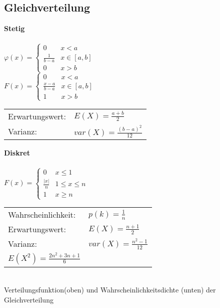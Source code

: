 		\subsection{Gleichverteilung}
      \begin{multicols}{3}
        \textbf{Stetig \skript{\pageref{sk-section-gleichverteilung-stetig}}}\\ \\
        $\varphi(x) = \begin{cases}
          0 & x < a\\
          \frac{1}{b-a} & x \in [a, b]\\
          0 & x > b
        \end{cases}$ \\
        $F(x) = \begin{cases}
          0 & x < a\\
          \frac{x-a}{b-a} & x \in [a,b]\\
          1 & x > b
        \end{cases}$\\
        \begin{tabular}{ll}
          Erwartungswert: & $E(X)=\frac{a + b}{2}$\\
          Varianz:  &$var(X)=\frac{(b-a)^2}{12}$\\
        \end{tabular}
      \columnbreak
      
        \textbf{Diskret \skript{\pageref{sk-section-gleichverteilung-diskret}}}\\ \\
        $F(x) = \begin{cases}
          0 & x \leq 1\\
          \frac{|x|}{n} & 1 \leq x \leq n \\
          1 & x \geq n
        \end{cases}$\\
        \begin{tabular}{ll}
          Wahrscheinlichkeit: & $p(k) = \frac{1}{n}$\\
          Erwartungswert: & $E(X)=\frac{n + 1}{2}$\\
          Varianz: & $var(X)=\frac{n^2-1}{12}$\\
          $E(X^2) = \frac{2n^2+3n+1}{6}$ &
        \end{tabular}
      \columnbreak
      	\\ 
        Verteilungsfunktion(oben) und Wahrscheinlichkeitsdichte (unten)
        der Gleichverteilung
      \end{multicols}
  
